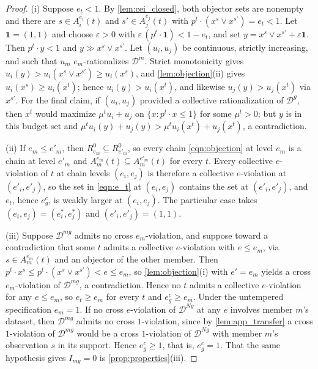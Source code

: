 \documentclass[11 pt]{article}
\begin{document}
\begin{proof}
(i) Suppose $e_{t} < 1$. By \autoref{lem:cei_closed}, both objector sets are nonempty and there are $s \in A^{e_i}_{i}(t)$ and $s' \in A^{e_j}_{j}(t)$ with $p^{t} \cdot (x^{s} \vee x^{s'}) = e_{t} < 1$. Let $\mathbf{1} = (1,1)$ and choose $\varepsilon > 0$ with $\varepsilon\, (p^{t} \cdot \mathbf{1}) < 1 - e_{t}$, and set $y = x^{s} \vee x^{s'} + \varepsilon \mathbf{1}$. Then $p^{t} \cdot y < 1$ and $y \gg x^{s} \vee x^{s'}$. Let $(u_{i}, u_{j})$ be continuous, strictly increasing, and such that $u_{m}$ $e_{m}$-rationalizes $\mathcal{D}^{m}$. Strict monotonicity gives $u_{i}(y) > u_{i}(x^{s} \vee x^{s'}) \geq u_{i}(x^{s})$, and \autoref{lem:objection}(ii) gives $u_{i}(x^{s}) \geq u_{i}(x^{t})$; hence $u_{i}(y) > u_{i}(x^{t})$, and likewise $u_{j}(y) > u_{j}(x^{t})$ via $x^{s'}$. For the final claim, if $(u_{i}, u_{j})$ provided a collective rationalization of $\mathcal{D}^{g}$, then $x^{t}$ would maximize $\mu^{t} u_{i} + u_{j}$ on $\{ x : p^{t} \cdot x \leq 1 \}$ for some $\mu^{t} > 0$; but $y$ is in this budget set and $\mu^{t} u_{i}(y) + u_{j}(y) > \mu^{t} u_{i}(x^{t}) + u_{j}(x^{t})$, a contradiction.

(ii) If $e_{m} \leq e'_{m}$, then $R^{0}_{e_m} \subseteq R^{0}_{e'_m}$, so every chain \eqref{eqn:objection} at level $e_{m}$ is a chain at level $e'_{m}$ and $A^{e_m}_{m}(t) \subseteq A^{e'_m}_{m}(t)$ for every $t$. Every collective $e$-violation of $t$ at chain levels $(e_{i}, e_{j})$ is therefore a collective $e$-violation at $(e'_{i}, e'_{j})$, so the set in \eqref{eqn:e_t} at $(e_{i}, e_{j})$ contains the set at $(e'_{i}, e'_{j})$, and $e_{t}$, hence $e^{c}_{g}$, is weakly larger at $(e_{i}, e_{j})$. The particular case takes $(e_{i}, e_{j}) = (e^{*}_{i}, e^{*}_{j})$ and $(e'_{i}, e'_{j}) = (1,1)$.

(iii) Suppose $\mathcal{D}^{mg}$ admits no cross $e_{m}$-violation, and suppose toward a contradiction that some $t$ admits a collective $e$-violation with $e \leq e_{m}$, via $s \in A^{e_m}_{m}(t)$ and an objector of the other member. Then $p^{t} \cdot x^{s} \leq p^{t} \cdot (x^{s} \vee x^{s'}) < e \leq e_{m}$, so \autoref{lem:objection}(i) with $e' = e_{m}$ yields a cross $e_{m}$-violation of $\mathcal{D}^{mg}$, a contradiction. Hence no $t$ admits a collective $e$-violation for any $e \leq e_{m}$, so $e_{t} \geq e_{m}$ for every $t$ and $e^{c}_{g} \geq e_{m}$. Under the untempered specification $e_{m} = 1$. If no cross $e$-violation of $\mathcal{D}^{Ng}$ at any $e$ involves member $m$'s dataset, then $\mathcal{D}^{mg}$ admits no cross $1$-violation, since by \autoref{lem:app_transfer} a cross $1$-violation of $\mathcal{D}^{mg}$ would be a cross $1$-violation of $\mathcal{D}^{Ng}$ with member $m$'s observation $s$ in its support. Hence $e^{c}_{g} \geq 1$, that is, $e^{c}_{g} = 1$. That the same hypothesis gives $I_{mg} = 0$ is \autoref{prop:properties}(iii).
\end{proof}
\end{document}
